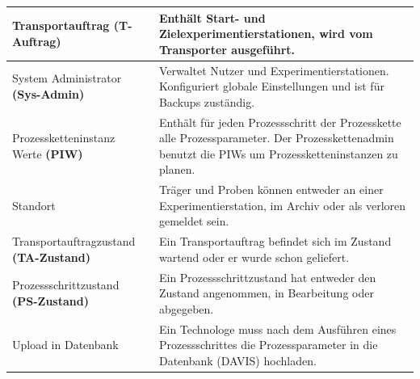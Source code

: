 \documentclass[enabledeprecatedfontcommands,fontsize=12pt,paper=a4,twoside]{scrartcl}
\begin{document}
\begin{longtable}[c]{|p{7cm}|p{8cm}|}
Transportauftrag \textbf{(T-Auftrag)}          & Enthält Start- und Zielexperimentierstationen, wird vom Transporter ausgeführt.                                                                                                                                                                      \\ \hline
System Administrator \textbf{(Sys-Admin)}      & Verwaltet Nutzer und Experimentierstationen. Konfiguriert globale Einstellungen und ist für Backups zuständig.                                                                                                                                         \\ \hline
Prozessketteninstanz Werte \textbf{(PIW)}      & Enthält für jeden Prozessschritt der Prozesskette alle Prozessparameter. Der Prozesskettenadmin benutzt die PIWs um Prozessketteninstanzen zu planen.                                                                                                 \\ \hline
Standort                                                        & Träger und Proben können entweder an einer Experimentierstation, im Archiv oder als verloren gemeldet sein.                                                                                                                                           \\ \hline
Transportauftragzustand \textbf{(TA-Zustand)}  & Ein Transportauftrag befindet sich im Zustand wartend oder er wurde schon geliefert.                                                                                                                                                                  \\ \hline
Prozessschrittzustand \textbf{(PS-Zustand)}    & Ein Prozessschrittzustand hat entweder den Zustand angenommen, in Bearbeitung oder abgegeben.                                                                                                                                                         \\ \hline
Upload in Datenbank                                             & Ein Technologe muss nach dem Ausführen eines Prozessschrittes die Prozessparameter in die Datenbank (DAVIS) hochladen.                                                                                                                                \\ \hline
\end{longtable}
\end{document}

